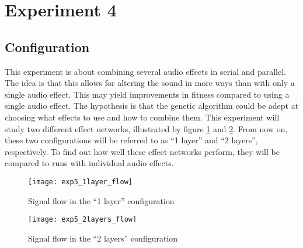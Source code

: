 \section{Experiment 4} %

\subsection{Configuration}
This experiment is about combining several audio effects in serial and parallel. The idea is that this allows for altering the sound in more ways than with only a single audio effect. This may yield improvements in fitness compared to using a single audio effect. The hypothesis is that the genetic algorithm could be adept at choosing what effects to use and how to combine them. This experiment will study two different effect networks, illustrated by figure \ref{fig:exp5_1layer_flow} and \ref{fig:exp5_2layers_flow}. From now on, these two configurations will be referred to as ``1 layer'' and ``2 layers'', respectively. To find out how well these effect networks perform, they will be compared to runs with individual audio effects.

\begin{figure}[H]
    \centering
    \texttt{[image: exp5\_1layer\_flow]}
    \caption{Signal flow in the ``1 layer'' configuration}
    \label{fig:exp5_1layer_flow}
\end{figure}

\begin{figure}[H]
    \centering
    \texttt{[image: exp5\_2layers\_flow]}
    \caption{Signal flow in the ``2 layers'' configuration}
    \label{fig:exp5_2layers_flow}
\end{figure}

